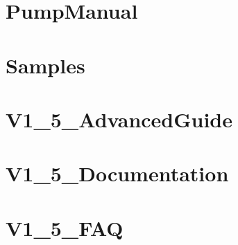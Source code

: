 \documentclass[twoside]{book}
\newcommand{\+}{\discretionary{\mbox{\scriptsize$\hookleftarrow$}}{}{}}
\begin{document}
\chapter{Pump\+Manual}
\label{md_smacc_sm_reference_library_sm_panda_moveit_libfranka_3rdparty_googletest_googletest_docs_PumpManual}

\chapter{Samples}
\label{md_smacc_sm_reference_library_sm_panda_moveit_libfranka_3rdparty_googletest_googletest_docs_Samples}

\chapter{V1\+\_\+5\+\_\+\+Advanced\+Guide}
\label{md_smacc_sm_reference_library_sm_panda_moveit_libfranka_3rdparty_googletest_googletest_docs_V1_5_AdvancedGuide}

\chapter{V1\+\_\+5\+\_\+\+Documentation}
\label{md_smacc_sm_reference_library_sm_panda_moveit_libfranka_3rdparty_googletest_googletest_docs_V1_5_Documentation}

\chapter{V1\+\_\+5\+\_\+\+F\+AQ}
\label{md_smacc_sm_reference_library_sm_panda_moveit_libfranka_3rdparty_googletest_googletest_docs_V1_5_FAQ}

\end{document}
